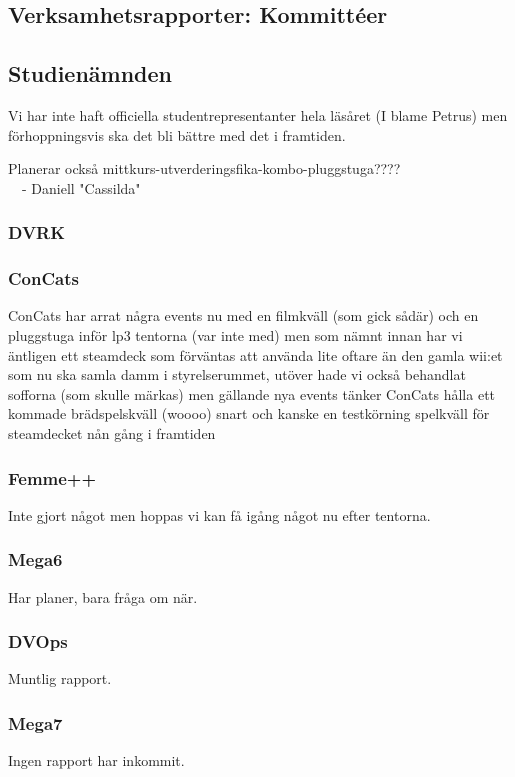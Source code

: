 \documentclass[protokoll]{dvd}
\begin{document}
\subsection{Verksamhetsrapporter: Kommittéer}

\subsection{Studienämnden}
Vi har inte haft officiella studentrepresentanter hela läsåret (I blame Petrus) men förhoppningsvis ska det bli bättre med det i framtiden.

Planerar också mittkurs-utverderingsfika-kombo-pluggstuga????
\\
\ \ - Daniell "Cassilda"

\subsubsection*{DVRK}


\subsubsection*{ConCats}
 ConCats har arrat några events nu med en filmkväll (som gick sådär) och en pluggstuga inför lp3 tentorna (var inte med) men som nämnt innan har vi äntligen ett steamdeck som förväntas att använda lite oftare än den gamla wii:et som nu ska samla damm i styrelserummet, utöver hade vi också behandlat sofforna (som skulle märkas) men gällande nya events tänker ConCats hålla ett kommade brädspelskväll (woooo) snart och kanske en testkörning spelkväll för steamdecket nån gång i framtiden

\subsubsection*{Femme++}
Inte gjort något men hoppas vi kan få igång något nu efter tentorna.

\subsubsection*{Mega6}
Har planer, bara fråga om när. 

\subsubsection*{DVOps}
Muntlig rapport.

\subsubsection*{Mega7}
Ingen rapport har inkommit.
\end{document}
